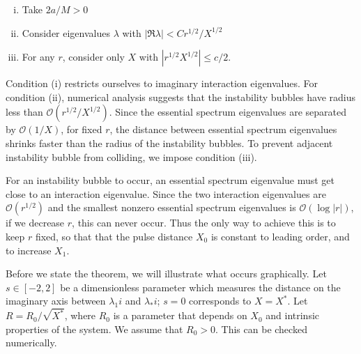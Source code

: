 \documentclass[thesis.tex]{subfiles}
\begin{document}
\begin{enumerate}[(i)]
	\item Take $2a/M > 0$
	\item Consider eigenvalues $\lambda$ with $|\Re \lambda| < C r^{1/2}/X^{1/2}$
	\item For any $r$, consider only $X$ with
	$\left| r^{1/2} X^{1/2} \right| \leq c/2$. 
	\end{enumerate}

Condition (i) restricts ourselves to imaginary interaction eigenvalues. For condition (ii), numerical analysis suggests that the instability bubbles have radius less than $\mathcal{O}(r^{1/2}/X^{1/2})$. Since the essential spectrum eigenvalues are separated by $\mathcal{O}(1/X)$, for fixed $r$, the distance between essential spectrum eigenvalues shrinks faster than the radius of the instability bubbles. To prevent adjacent instability bubble from colliding, we impose condition (iii).

For an instability bubble to occur, an essential spectrum eigenvalue must get close to an interaction eigenvalue. Since the two interaction eigenvalues are $\mathcal{O}(r^{1/2})$ and the smallest nonzero essential spectrum eigenvalues is $\mathcal{O}(\log|r|)$, if we decrease $r$, this can never occur. Thus the only way to achieve this is to keep $r$ fixed, so that that the pulse distance $X_0$ is constant to leading order, and to increase $X_1$.

Before we state the theorem, we will illustrate what occurs graphically. Let $s \in [-2, 2]$ be a dimensionless parameter which measures the distance on the imaginary axis between $\lambda_1 i$ and $\lambda_* i$; $s = 0$ corresponds to $X = X^*$. Let $R = R_0 / \sqrt{X^*}$, where $R_0$ is a parameter that depends on $X_0$ and intrinsic properties of the system. We assume that $R_0 > 0$. This can be checked numerically.
\end{document}
